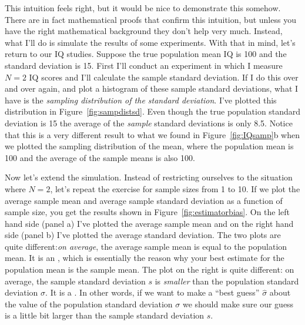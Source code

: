 This intuition feels right, but it would be nice to demonstrate this somehow. There are in fact mathematical proofs that confirm this intuition, but unless you have the right mathematical background they don't help very much. Instead, what I'll do is simulate the results of some experiments. With that in mind, let's return to our IQ studies. Suppose the true population mean IQ is 100 and the standard deviation is 15. First I'll conduct an experiment in which I measure $N=2$ IQ scores and I'll calculate the sample standard deviation. If I do this over and over again, and plot a histogram of these sample standard deviations, what I have is the {\it sampling distribution of the standard deviation}. I've plotted this distribution in Figure~\ref{fig:sampdistsd}. Even though the true population standard deviation is 15 the average of the {\it sample} standard deviations is only 8.5. Notice that this is a very different result to what we found in Figure~\ref{fig:IQsamp}b when we plotted the sampling distribution of the mean, where the population mean is 100 and the average of the sample means is also 100. 

Now let's extend the simulation. Instead of restricting ourselves to the situation where $N=2$, let's repeat the exercise for sample sizes from 1 to 10. If we plot the average sample mean and average sample standard deviation as a function of sample size, you get the results shown in Figure~\ref{fig:estimatorbias}. On the left hand side (panel a) I've plotted the average sample mean and on the right hand side (panel b) I've plotted the average standard deviation. The two plots are quite different:{\it on average}, the average sample mean is equal to the population mean. It is an , which is essentially the reason why your best estimate for the population mean is the sample mean. The plot on the right is quite different: on average, the sample standard deviation $s$ is {\it smaller} than the population standard deviation $\sigma$. It is a . In other words, if we want to make a ``best guess'' $\hat\sigma$ about the value of the population standard deviation $\sigma$ we should make sure our guess is a little bit larger than the sample standard deviation $s$. 

